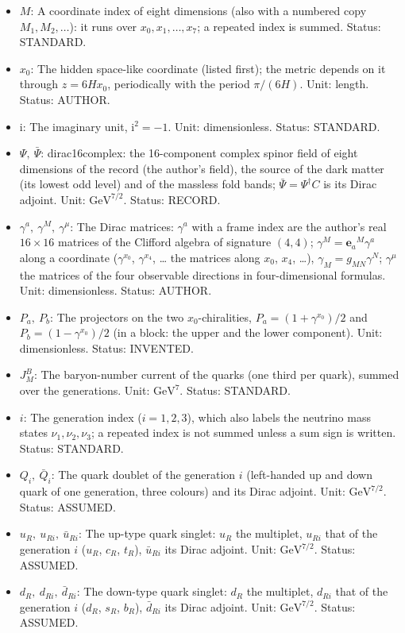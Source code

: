 \documentclass[
  10pt,
]{article}
\begin{document}
\begin{itemize}
  \(\Lambda_\star\): The scale of the portal operators I11, I12, I13.
  Unit: GeV. Value: only the combinations \(c/\Lambda_\star^n\) enter.
  Status: INVENTED.
\item
  \(M\): A coordinate index of eight dimensions (also with a numbered
  copy \(M_1, M_2, \dots\)): it runs over \(x_0, x_1, \dots, x_7\); a
  repeated index is summed. Status: STANDARD.
\item
  \(x_0\): The hidden space-like coordinate (listed first); the metric
  depends on it through \(z = 6Hx_0\), periodically with the period
  \(\pi/(6H)\). Unit: length. Status: AUTHOR.
\item
  \(\mathrm{i}\): The imaginary unit, \(\mathrm{i}^2 = -1\). Unit:
  dimensionless. Status: STANDARD.
\item
  \(\Psi,\ \bar\Psi\): dirac16complex: the 16-component complex spinor
  field of eight dimensions of the record (the author's field), the
  source of the dark matter (its lowest odd level) and of the massless
  fold bands; \(\bar\Psi = \Psi^\dagger C\) is its Dirac adjoint. Unit:
  \(\mathrm{GeV}^{7/2}\). Status: RECORD.
\item
  \(\gamma^a,\ \gamma^M,\ \gamma^\mu\): The Dirac matrices: \(\gamma^a\)
  with a frame index are the author's real \(16 \times 16\) matrices of
  the Clifford algebra of signature \((4, 4)\);
  \(\gamma^M = \mathbf{e}_a{}^M\gamma^a\) along a coordinate
  (\(\gamma^{x_0}\), \(\gamma^{x_4}\), \ldots{} the matrices along
  \(x_0\), \(x_4\), \ldots), \(\gamma_M = g_{MN}\gamma^N\);
  \(\gamma^\mu\) the matrices of the four observable directions in
  four-dimensional formulas. Unit: dimensionless. Status: AUTHOR.
\item
  \(P_a,\ P_b\): The projectors on the two \(x_0\)-chiralities,
  \(P_a = (1 + \gamma^{x_0})/2\) and \(P_b = (1 - \gamma^{x_0})/2\) (in
  a block: the upper and the lower component). Unit: dimensionless.
  Status: INVENTED.
\item
  \(J^{B}_M\): The baryon-number current of the quarks (one third per
  quark), summed over the generations. Unit: \(\mathrm{GeV}^{7}\).
  Status: STANDARD.
\item
  \(i\): The generation index (\(i = 1, 2, 3\)), which also labels the
  neutrino mass states \(\nu_1, \nu_2, \nu_3\); a repeated index is not
  summed unless a sum sign is written. Status: STANDARD.
\item
  \(Q_i,\ \bar Q_i\): The quark doublet of the generation \(i\)
  (left-handed up and down quark of one generation, three colours) and
  its Dirac adjoint. Unit: \(\mathrm{GeV}^{7/2}\). Status: ASSUMED.
\item
  \(u_R,\ u_{Ri},\ \bar u_{Ri}\): The up-type quark singlet: \(u_R\) the
  multiplet, \(u_{Ri}\) that of the generation \(i\) (\(u_R\), \(c_R\),
  \(t_R\)), \(\bar u_{Ri}\) its Dirac adjoint. Unit:
  \(\mathrm{GeV}^{7/2}\). Status: ASSUMED.
\item
  \(d_R,\ d_{Ri},\ \bar d_{Ri}\): The down-type quark singlet: \(d_R\)
  the multiplet, \(d_{Ri}\) that of the generation \(i\) (\(d_R\),
  \(s_R\), \(b_R\)), \(\bar d_{Ri}\) its Dirac adjoint. Unit:
  \(\mathrm{GeV}^{7/2}\). Status: ASSUMED.
\end{itemize}
\end{document}
